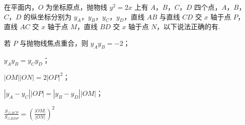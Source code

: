 \documentclass[UTF8,a4paper,oneside,11pt]{ctexbook}
\begin{document}
\begin{problem}
在平面内，\(O\) 为坐标原点，抛物线 \(y^2=2x\) 上有 \(A\)，\(B\)，\(C\)，\(D\) 四个点，\(A\)，\(B\)，\(C\)，\(D\) 的纵坐标分别为 \(y_A\)，\(y_B\)，\(y_C\)，\(y_D\)，直线 \(AB\) 与直线 \(CD\) 交 \(x\) 轴于点 \(P\)，直线 \(AC\) 交 \(x\) 轴于点 \(M\)，直线 \(BD\) 交 \(x\) 轴于点 \(N\)，以下说法正确的有\fillinblank{}.

\begin{circlelist}
\item 若 \(P\) 与抛物线焦点重合，则 \(y_Ay_B=-2\)；
\item \(y_Ay_B=y_Cy_D\)；
\item \(|OM||ON|=2|OP|^2\)；
\item \(\left| y_A-y_C \right||OP|=\left| y_B-y_D \right||OM|\)；
\item \(\frac{S_{\triangle ACP}}{S_{\triangle BDP}}=\left( \frac{|OM|}{|ON|} \right)^2\)
\end{circlelist}
\end{problem}

\begin{answer}
\end{answer}
\end{document}

